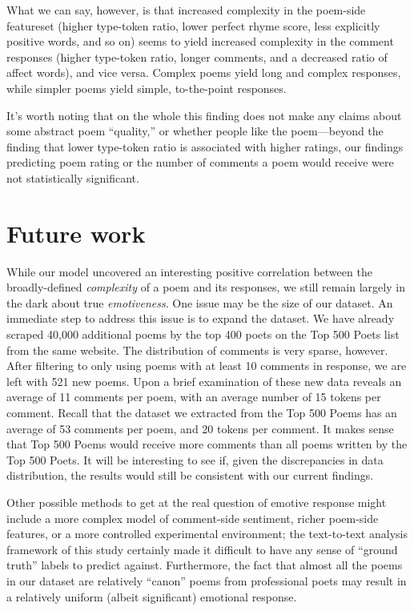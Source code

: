 \documentclass[11pt]{article}
\begin{document}
What we can say, however, is that increased complexity in the poem-side featureset (higher type-token ratio, lower perfect rhyme score, less explicitly positive words, and so on) seems to yield increased complexity in the comment responses (higher type-token ratio, longer comments, and a decreased ratio of affect words), and vice versa. Complex poems yield long and complex responses, while simpler poems yield simple, to-the-point responses.

It's worth noting that on the whole this finding does not make any claims about some abstract poem ``quality,'' or whether people like the poem---beyond the finding that lower type-token ratio is associated with higher ratings, our findings predicting poem rating or the number of comments a poem would receive were not statistically significant. 

\section{Future work}

While our model uncovered an interesting positive correlation between the broadly-defined \emph{complexity} of a poem and its responses, we still remain largely in the dark about true \emph{emotiveness}. One issue may be the size of our dataset. An immediate step to address this issue is to expand the dataset. We have already scraped 40,000 additional poems by the top 400 poets on the Top 500 Poets list from the same website. The distribution of comments is very sparse, however. After filtering to only using poems with at least 10 comments in response, we are left with 521 new poems. Upon a brief examination of these new data reveals an average of 11 comments per poem, with an average number of 15 tokens per comment. Recall that the dataset we extracted from the Top 500 Poems has an average of 53 comments per poem, and 20 tokens per comment. It makes sense that Top 500 Poems would receive more comments than all poems written by the Top 500 Poets. It will be interesting to see if, given the discrepancies in data distribution, the results would still be consistent with our current findings.

Other possible methods to get at the real question of emotive response might include a more complex model of comment-side sentiment, richer poem-side features, or a more controlled experimental environment; the text-to-text analysis framework of this study certainly made it difficult to have any sense of ``ground truth'' labels to predict against. Furthermore, the fact that almost all the poems in our dataset are relatively ``canon'' poems from professional poets may result in a relatively uniform (albeit significant) emotional response. 
\end{document}
